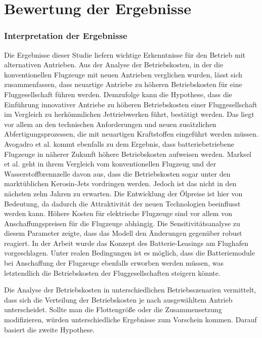 \section{Bewertung der Ergebnisse}
\label{s:Bewertung der Ergebnisse}

\subsubsection{Interpretation der Ergebnisse}
Die Ergebnisse dieser Studie liefern wichtige Erkenntnisse für den Betrieb mit alternativen Antrieben.
Aus der Analyse der Betriebskosten, in der die konventionellen Flugzeuge mit neuen Antrieben verglichen wurden, 
lässt sich zusammenfassen, dass neuartige Antriebe zu höheren Betriebskosten für eine Fluggesellschaft führen werden.
Demzufolge kann die Hypothese, dass die Einführung innovativer Antriebe zu höheren 
Betriebskosten einer Fluggesellschaft im Vergleich zu herkömmlichen Jettriebwerken führt, bestätigt werden. 
Das liegt vor allem an den technischen Anforderungen und neuen zusätzlichen Abfertigungsprozessen, 
die mit neuartigen Kraftstoffen eingeführt werden müssen. 
Avogadro et al. \cite{avogadro2024demystifying} kommt ebenfalls zu dem Ergebnis,
dass batteriebetriebene Flugzeuge in näherer Zukunft höhere Betriebskosten aufweisen werden. 
Marksel et al. \cite{marksel2023comparative} geht in ihrem Vergleich 
vom konventionellen Flugzeug und der Wasserstoffbrennzelle davon aus,
dass die Betriebskosten sogar unter den marktüblichen Kerosin-Jets vordringen werden.
Jedoch ist das nicht in den nächsten zehn Jahren zu erwarten.
Die Entwicklung der Ölpreise ist hier von Bedeutung, 
da dadurch die Attraktivität der neuen Technologien beeinflusst werden kann.
%
Höhere Kosten für elektrische Flugzeuge sind vor allem von Anschaffungspreisen für die Flugzeuge abhängig. 
Die Sensitivitätsanalyse zu diesem Parameter zeigte, dass das Modell den Änderungen gegenüber robust reagiert.
In der Arbeit wurde das Konzept des Batterie-Leasings am Flughafen vorgeschlagen. 
Unter realen Bedingungen ist es möglich, dass die Batteriemodule bei Anschaffung 
der Flugzeuge ebenfalls erworben werden müssen, 
was letztendlich die Betriebskosten der Fluggesellschaften steigern könnte. 

%
Die Analyse der Betriebskosten in unterschiedlichen Betriebsszenarien vermittelt, 
dass sich die Verteilung der Betriebskosten je nach ausgewähltem Antrieb unterscheidet. 
Sollte man die Flottengröße oder die Zusammensetzung modifizieren, 
würden unterschiedliche Ergebnisse zum Vorschein kommen.
Darauf basiert die zweite Hypothese. 


